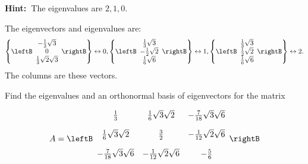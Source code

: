 \begin{enumialphparenastyle}
\begin{ex}
\textbf{Hint:\ }The eigenvalues are $2,1,0.$
\begin{sol}
The eigenvectors and eigenvalues are:
\[
\left\{ \leftB
\begin{array}{c}
-\frac{1}{3}\sqrt{3} \\
0 \\
\frac{1}{3}\sqrt{2}\sqrt{3}
\end{array}
\rightB \right\} \leftrightarrow 0,\left\{ \leftB
\begin{array}{c}
\frac{1}{3}\sqrt{3} \\
-\frac{1}{2}\sqrt{2} \\
\frac{1}{6}\sqrt{6}
\end{array}
\rightB \right\} \leftrightarrow 1,\allowbreak \left\{ \leftB
\begin{array}{c}
\frac{1}{3}\sqrt{3} \\
\frac{1}{2}\sqrt{2} \\
\frac{1}{6}\sqrt{6}
\end{array}
\rightB \right\} \leftrightarrow 2.
\]
The columns are these vectors.
\end{sol}
\end{ex}

\begin{ex} Find the eigenvalues and an orthonormal basis of eigenvectors for the
matrix

\begin{equation*}
A = \leftB 
\begin{array}{ccc}
\vspace{0.05in}\frac{1}{3} & \vspace{0.05in}\frac{1}{6}\sqrt{3}\sqrt{2} & -
\vspace{0.05in}\frac{7}{18}\sqrt{3}\sqrt{6} \\ 
\vspace{0.05in}\frac{1}{6}\sqrt{3}\sqrt{2} & \vspace{0.05in}\frac{3}{2} & -
\vspace{0.05in}\frac{1}{12}\sqrt{2}\sqrt{6} \\ 
-\vspace{0.05in}\frac{7}{18}\sqrt{3}\sqrt{6} & -\vspace{0.05in}\frac{1}{12}
\sqrt{2}\sqrt{6} & -\vspace{0.05in}\frac{5}{6}
\end{array}
\rightB
\end{equation*}


\end{ex}
\end{enumialphparenastyle}
